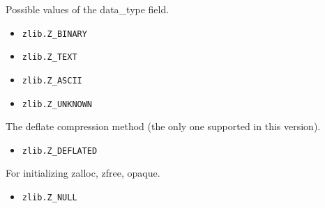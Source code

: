 Possible values of the data\_type field.

\begin{itemize}
\item
  \texttt{zlib.Z\_BINARY}
\item
  \texttt{zlib.Z\_TEXT}
\item
  \texttt{zlib.Z\_ASCII}
\item
  \texttt{zlib.Z\_UNKNOWN}
\end{itemize}

The deflate compression method (the only one supported in this version).

\begin{itemize}
\item
  \texttt{zlib.Z\_DEFLATED}
\end{itemize}

For initializing zalloc, zfree, opaque.

\begin{itemize}
\item
  \texttt{zlib.Z\_NULL}
\end{itemize}
